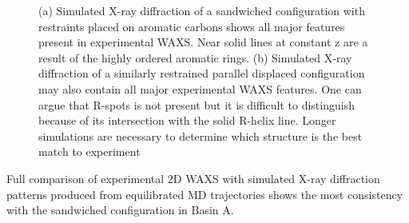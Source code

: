 \documentclass{article}
\begin{document}
\begin{figure}[!ht]
\begin{subfigure}{0.475\textwidth}
		\caption{}\label{fig:rzoffsetrestrained}
	\end{subfigure}
	\caption{(a) Simulated X-ray diffraction of a sandwiched configuration
	with restraints placed on aromatic carbons shows all major features
	present in experimental WAXS. Near solid lines at constant z are a result of 
	the highly ordered aromatic rings. (b) Simulated X-ray diffraction of a similarly
	restrained parallel displaced configuration may also contain all
	major experimental WAXS features. One can argue that R-spots is not present
	but it is difficult to distinguish because of its intersection with the solid
	R-helix line. Longer simulations are necessary to determine which structure
	is the best match to experiment}\label{fig:XRDrestrained}
  \end{figure}
  
  Full comparison of experimental 2D WAXS with simulated X-ray diffraction
  patterns produced from equilibrated MD trajectories shows the most consistency
  with the sandwiched configuration in Basin A.
\end{document}
